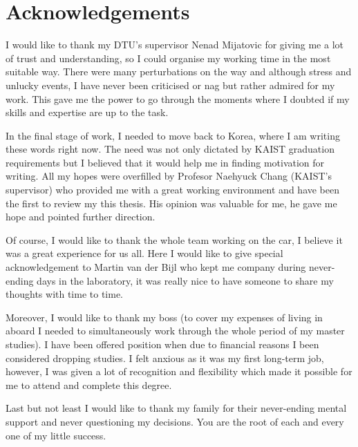 \chapter{Acknowledgements}

I would like to thank my DTU's supervisor Nenad Mijatovic for giving me a lot of trust and understanding, so I could organise my working time in the most suitable way. There were many perturbations on the way and although stress and unlucky events, I have never been criticised or nag but rather admired for my work. This gave me the power to go through the moments where I doubted if my skills and expertise are up to the task.

In the final stage of work, I needed to move back to Korea, where I am writing these words right now. The need was not only dictated by KAIST graduation requirements but I believed that it would help me in finding motivation for writing. All my hopes were overfilled by Profesor Naehyuck Chang (KAIST's supervisor) who provided me with a great working environment and have been the first to review my this thesis. His opinion was valuable for me, he gave me hope and pointed further direction.

Of course, I would like to thank the whole team working on the car, I believe it was a great experience for us all. Here I would like to give special acknowledgement to Martin van der Bijl who kept me company during never-ending days in the laboratory, it was really nice to have someone to share my thoughts with time to time.

Moreover, I would like to thank my boss (to cover my expenses of living in aboard I needed to simultaneously work through the whole period of my master studies). I have been offered position when due to financial reasons I been considered dropping studies. I felt anxious as it was my first long-term job, however, I was given a lot of recognition and flexibility which made it possible for me to attend and complete this degree.

Last but not least I would like to thank my family for their never-ending mental support and never questioning my decisions. You are the root of each and every one of my little success.  